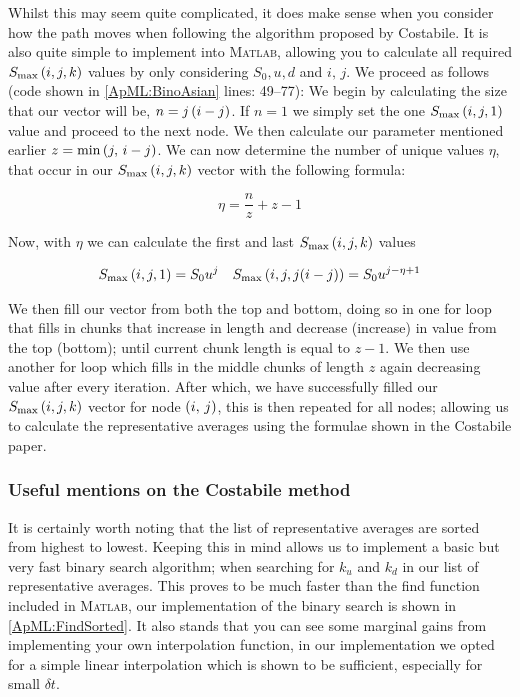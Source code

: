 Whilst this may seem quite complicated, it does make sense when you consider how the path moves when following the algorithm proposed by Costabile. It is also quite simple to implement into \textsc{Matlab}, allowing you to calculate all required \(S_\text{max}\left({i},{j},{k}\right)\) values by only considering \(S_0, u, d\) and \(i,\,j\). We proceed as follows (code shown in \autoref{ApML:BinoAsian} lines: 49--77):
\nline{}
We begin by calculating the size that our vector will be, \(n = j\left(i-j\right)\). If \(n = 1\) we simply set the one \(S_\text{max}\left({i},{j},{1}\right)\) value and proceed to the next node. We then calculate our parameter mentioned earlier \(z = \min\left(j,\,i-j\right)\). We can now determine the number of unique values \({\eta}\), that occur in our \(S_\text{max}\left({i},{j},{k}\right)\) vector with the following formula:

\begin{equation*}
    {\eta} = \frac{n}{z} + z - 1
\end{equation*}

Now, with \(\eta \) we can calculate the first and last \(S_\text{max}\left({i},{j},{k}\right)\) values

\begin{align*}
    S_\text{max}\left({i},{j},{1}\right) = S_0u^j && S_\text{max}\left({i},{j},{j(i-j)}\right) = S_0u^{j-\eta + 1}
\end{align*}

We then fill our vector from both the top and bottom, doing so in one for loop that fills in chunks that increase in length and decrease (increase) in value from the top (bottom); until current chunk length is equal to \(z - 1\). We then use another for loop which fills in the middle chunks of length \(z\) again decreasing value after every iteration. After which, we have successfully filled our \(S_\text{max}\left({i},{j},{k}\right)\) vector for node \(\left(i,\,j\right)\), this is then repeated for all nodes; allowing us to calculate the representative averages using the formulae shown in the Costabile paper. 

\subsubsection{Useful mentions on the Costabile method}

It is certainly worth noting that the list of representative averages are sorted from highest to lowest. Keeping this in mind allows us to implement a basic but very fast binary search algorithm; when searching for \(k_u\) and \(k_d\) in our list of representative averages. This proves to be much faster than the find function included in \textsc{Matlab}, our implementation of the binary search is shown in \autoref{ApML:FindSorted}. It also stands that you can see some marginal gains from implementing your own interpolation function, in our implementation we opted for a simple linear interpolation which is shown to be sufficient, especially for small \(\delta t\).

